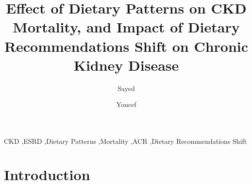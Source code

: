 \documentclass[times,twocolumn,final]{elsarticle}
\begin{document}

\begin{frontmatter}

\title{Effect of Dietary Patterns on CKD Mortality, and Impact of Dietary Recommendations Shift on  Chronic Kidney Disease} 


\author[1]{Sayed  } %
  
\author[2]{Youcef } %

\address[1]{Data Science Department, Ryerson University, Toronto, Canada}
\address[2]{Department of Information Technology Management, Ryerson University, Toronto, Canada}



\begin{abstract}

\end{abstract}

\begin{keyword}
\KWD CKD  \sep ESRD \sep  Dietary Patterns \sep  Mortality \sep  ACR \sep  Dietary Recommendations Shift
\end{keyword}

\end{frontmatter}

\section*{Introduction}


%

%
\newcommand{\specialcell}[2][c]{%
\begin{tabular}[#1]{@{}l@{}}#2\end{tabular}}






\end{document}
